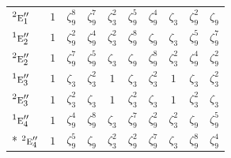\documentclass[10pt,a4paper]{article}
\numberwithin{equation}{section}
\newcommand{\irr}[1]{\text{\normalfont\scshape #1}}
\newcommand{\conjpair}[1]{{}^{#1}}
\newcommand{\rootunity}[1]{\zeta_{#1}}
\begin{document}
{\begin{longtable}{@{}lccccccccc@{}}
$\conjpair{2}\irr{e}_{1}''$ & $1$ & $\rootunity{9}^{8}$ & $\rootunity{9}^{7}$ & $\rootunity{3}^{2}$ & $\rootunity{9}^{5}$ & $\rootunity{9}^{4}$ & $\rootunity{3}$ & $\rootunity{9}^{2}$ & $\rootunity{9}$\\
$\conjpair{1}\irr{e}_{2}''$ & $1$ & $\rootunity{9}^{2}$ & $\rootunity{9}^{4}$ & $\rootunity{3}^{2}$ & $\rootunity{9}^{8}$ & $\rootunity{9}$ & $\rootunity{3}$ & $\rootunity{9}^{5}$ & $\rootunity{9}^{7}$\\
$\conjpair{2}\irr{e}_{2}''$ & $1$ & $\rootunity{9}^{7}$ & $\rootunity{9}^{5}$ & $\rootunity{3}$ & $\rootunity{9}$ & $\rootunity{9}^{8}$ & $\rootunity{3}^{2}$ & $\rootunity{9}^{4}$ & $\rootunity{9}^{2}$\\
$\conjpair{1}\irr{e}_{3}''$ & $1$ & $\rootunity{3}$ & $\rootunity{3}^{2}$ & $1$ & $\rootunity{3}$ & $\rootunity{3}^{2}$ & $1$ & $\rootunity{3}$ & $\rootunity{3}^{2}$\\
$\conjpair{2}\irr{e}_{3}''$ & $1$ & $\rootunity{3}^{2}$ & $\rootunity{3}$ & $1$ & $\rootunity{3}^{2}$ & $\rootunity{3}$ & $1$ & $\rootunity{3}^{2}$ & $\rootunity{3}$\\
$\conjpair{1}\irr{e}_{4}''$ & $1$ & $\rootunity{9}^{4}$ & $\rootunity{9}^{8}$ & $\rootunity{3}$ & $\rootunity{9}^{7}$ & $\rootunity{9}^{2}$ & $\rootunity{3}^{2}$ & $\rootunity{9}$ & $\rootunity{9}^{5}$\\*
$\conjpair{2}\irr{e}_{4}''$ & $1$ & $\rootunity{9}^{5}$ & $\rootunity{9}$ & $\rootunity{3}^{2}$ & $\rootunity{9}^{2}$ & $\rootunity{9}^{7}$ & $\rootunity{3}$ & $\rootunity{9}^{8}$ & $\rootunity{9}^{4}$\\
\bottomrule\end{longtable}}
\end{document}

